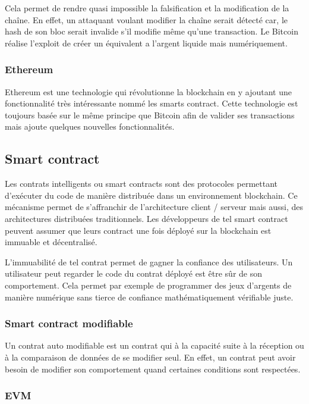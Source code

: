 Cela permet de rendre quasi impossible la falsification et la modification de la chaîne. En effet, un attaquant voulant modifier la chaîne serait
détecté car, le hash de son bloc serait invalide s'il modifie même qu'une transaction. Le Bitcoin réalise l'exploit de créer un équivalent a l'argent
liquide mais numériquement.

\subsubsection{Ethereum}

Ethereum est une technologie qui révolutionne la blockchain en y ajoutant une fonctionnalité très intéressante nommé les smarts contract. Cette
technologie est toujours basée sur le même principe que Bitcoin afin de valider ses transactions mais ajoute quelques nouvelles fonctionnalités.

\subsection{Smart contract}

Les contrats intelligents ou smart contracts sont des protocoles permettant d'exécuter du code de manière distribuée dans un environnement blockchain.
Ce mécanisme permet de s'affranchir de l'architecture client / serveur mais aussi, des architectures distribuées traditionnels. Les développeurs de
tel smart contract peuvent assumer que leurs contract une fois déployé sur la blockchain est immuable et décentralisé.

L'immuabilité de tel contrat permet de gagner la confiance des utilisateurs. Un utilisateur peut regarder le code du contrat déployé est être sûr 
de son comportement. Cela permet par exemple de programmer des jeux d'argents de manière numérique sans tierce de confiance mathématiquement 
vérifiable juste.

\subsubsection{Smart contract modifiable}
Un contrat auto modifiable est un contrat qui à la capacité suite à la réception ou à la
comparaison de données de se modifier seul. En effet, un contrat peut avoir besoin de
modifier son comportement quand certaines conditions sont respectées.

\subsubsection{EVM}


